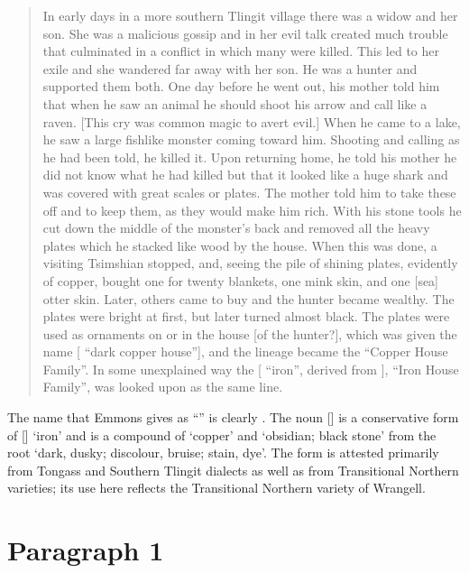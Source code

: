 \begin{quote}
In early days in a more southern Tlingit village there was a widow and her son.
She was a malicious gossip and in her evil talk created much trouble that culminated in a conflict in which many were killed.
This led to her exile and she wandered far away with her son.
He was a hunter and supported them both.
One day before he went out, his mother told him that when he saw an animal he should shoot his arrow and call like a raven.
[This cry was common magic to avert evil.]
When he came to a lake, he saw a large fishlike monster coming toward him.
Shooting and calling as he had been told, he killed it.
Upon returning home, he told his mother he did not know what he had killed but that it looked like a huge shark and was covered with great scales or plates.
The mother told him to take these off and to keep them, as they would make him rich.
With his stone tools he cut down the middle of the monster’s back and removed all the heavy plates which he stacked like wood by the house.
When this was done, a visiting Tsimshian stopped, and, seeing the pile of shining plates, evidently of copper, bought one for twenty blankets, one mink skin, and one [sea] otter skin.
Later, others came to buy and the hunter became wealthy.
The plates were bright at first, but later turned almost black.
The plates were used as ornaments on or in the house [of the hunter?], which was given the name  [ “dark copper house”], and the lineage became the  “Copper House Family”.
In some unexplained way the  [ “iron”, derived from ], “Iron House Family”, was looked upon as the same line.
\end{quote}

The name that Emmons gives as “” is clearly .
The noun  [] is a conservative form of  [] ‘iron’ and is a compound of  ‘copper’ and  ‘obsidian; black stone’ from the root  ‘dark, dusky; discolour, bruise; stain, dye’.
The form  is attested primarily from Tongass and Southern Tlingit dialects as well as from Transitional Northern varieties; its use here reflects the Transitional Northern variety of Wrangell.

\clearpage
\section{Paragraph 1}\label{sec:89-para-1}


